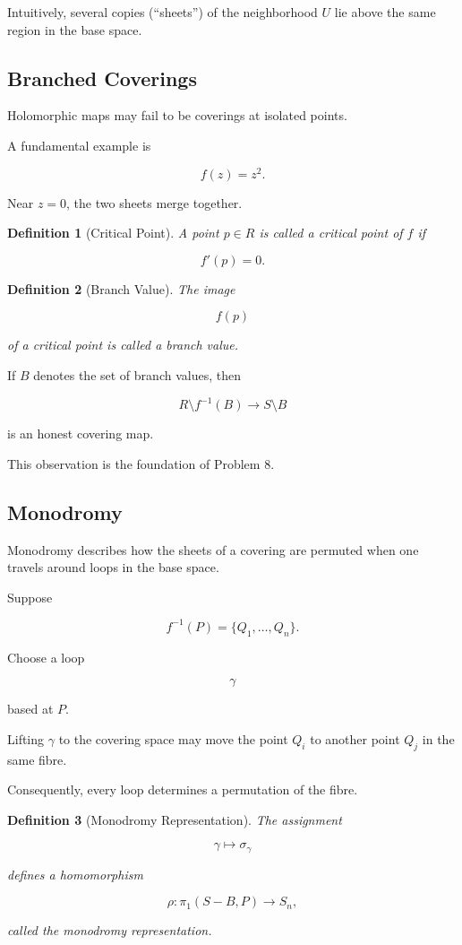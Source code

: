 \documentclass[12pt,a4paper]{article}
\theoremstyle{notespace}
\newtheorem{definition}{Definition}[subsection]
\begin{document}
Intuitively, several copies (``sheets'') of the neighborhood \(U\) lie
above the same region in the base space.

\subsection{Branched Coverings}

Holomorphic maps may fail to be coverings at isolated points.

A fundamental example is

\[
f(z)=z^2.
\]

Near \(z=0\), the two sheets merge together.

\begin{definition}[Critical Point]
	A point \(p\in R\) is called a critical point of \(f\) if
	
	\[
	f'(p)=0.
	\]
\end{definition}

\begin{definition}[Branch Value]
	The image
	
	\[
	f(p)
	\]
	
	of a critical point is called a branch value.
\end{definition}

If \(B\) denotes the set of branch values, then

\[
R\setminus f^{-1}(B)
\longrightarrow
S\setminus B
\]

is an honest covering map.

This observation is the foundation of Problem 8.

\subsection{Monodromy}

Monodromy describes how the sheets of a covering are permuted when one
travels around loops in the base space.

Suppose

\[
f^{-1}(P)
=
\{Q_1,\ldots,Q_n\}.
\]

Choose a loop

\[
\gamma
\]

based at \(P\).

Lifting \(\gamma\) to the covering space may move the point \(Q_i\) to
another point \(Q_j\) in the same fibre.

Consequently, every loop determines a permutation of the fibre.

\begin{definition}[Monodromy Representation]
	The assignment
	
	\[
	\gamma
	\longmapsto
	\sigma_\gamma
	\]
	
	defines a homomorphism
	
	\[
	\rho:
	\pi_1(S-B,P)
	\longrightarrow
	S_n,
	\]
	
	called the monodromy representation.
\end{definition}
\end{document}
